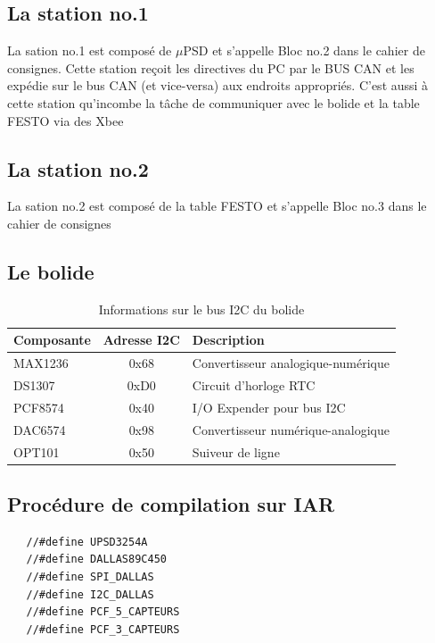 \documentclass[10pt,a4paper,final]{article}
\begin{document}
\begin{spacing}{1.5}
\subsection{La station no.1}
La sation no.1 est composé de $\mu$PSD et s'appelle Bloc no.2 dans le cahier de consignes. Cette station reçoit les directives du PC par le BUS CAN et les expédie sur le bus CAN (et vice-versa) aux endroits appropriés. C'est aussi à cette station qu'incombe la tâche de communiquer avec le bolide et la table FESTO via des Xbee
\subsection{La station no.2}
La sation no.2 est composé de la table FESTO et s'appelle Bloc no.3 dans le cahier de consignes

\subsection{Le bolide}
\begin{table}[!ht]
\centering
\begin{tabular}{|l|c|l|}
\hline 
\textbf{Composante} & \textbf{Adresse I{\small 2}C} & \textbf{Description} \\ 
\hline 
MAX1236 & 0x68 & Convertisseur analogique-numérique \\ 
\hline 
DS1307  & 0xD0 & Circuit d'horloge RTC \\ 
\hline 
PCF8574 & 0x40 & I/O Expender pour bus I{\small 2}C \\ 
\hline 
DAC6574 & 0x98  & Convertisseur numérique-analogique  \\ 
\hline 
OPT101  &  0x50 & Suiveur de ligne  \\ 
\hline 
\end{tabular} 
\caption{Informations sur le bus I{\small 2}C du bolide}
\label{tab:testtab1}
\end{table}

\subsection{Procédure de compilation sur IAR}
\end{spacing}
\begin{verbatim}
   //#define UPSD3254A
   //#define DALLAS89C450
   //#define SPI_DALLAS
   //#define I2C_DALLAS
   //#define PCF_5_CAPTEURS
   //#define PCF_3_CAPTEURS
\end{verbatim}
\end{document}
